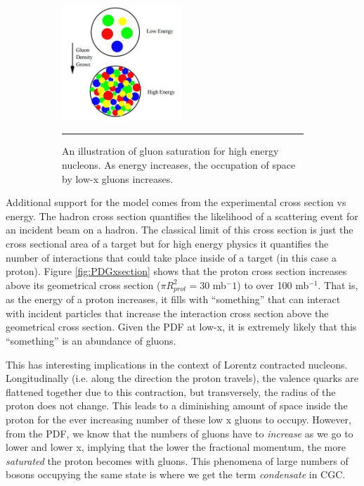 \begin{figure}
\centering
\ContinuedFloat
\begin{subfigure}[h]{0.8\textwidth}
  \centering
    \includegraphics[width=0.5\textwidth]{Figures/gluondensityCGC.jpg}
  \caption[Illustration of gluon saturation in Color-Glass Condensate.]{An illustration of gluon saturation for high energy nucleons\citep{McLerran:2001sr}. As energy increases, the occupation of space by low-x gluons increases.}
  \label{fig:gluonsaturation}
    \rule{35em}{0.5pt}
\end{subfigure}
\caption{}
\end{figure}

Additional support for the model comes from the experimental cross section vs energy. The hadron cross section quantifies the likelihood of a scattering event for an incident beam on a hadron. The classical limit of this cross section is just the cross sectional area of a target but for high energy physics it quantifies the number of interactions that could take place inside of a target (in this case a proton). Figure \ref{fig:PDGxsection} shows that the proton cross section increases above its geometrical cross section ($\pi R_{prot}^2 = $30 mb${^-1}$) to over 100 mb$^{-1}$\citep{PDGcrosssection}\citep{Itakura2012}. That is, as the energy of a proton increases, it fills with ``something'' that can interact with incident particles that increase the interaction cross section above the geometrical cross section. Given the PDF at low-x, it is extremely likely that this ``something'' is an abundance of gluons.

This has interesting implications in the context of Lorentz contracted nucleons. Longitudinally (i.e. along the direction the proton travels), the valence quarks are flattened together due to this contraction, but transversely, the radius of the proton does not change. This leads to a diminishing amount of space inside the proton for the ever increasing number of these low x gluons to occupy. However, from the PDF, we know that the numbers of gluons have to \textit{increase} as we go to lower and lower x, implying that the lower the fractional momentum, the more \textit{saturated} the proton becomes with gluons. This phenomena of large numbers of bosons occupying the same state is where we get the term \textit{condensate} in CGC.

